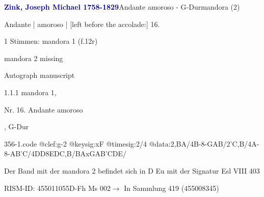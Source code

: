 \documentclass[twocolumn]{book}
\begin{document}
\par \vspace{7pt} \textcolor{darkblue}{\textbf{Zink, Joseph Michael  1758-1829}}\hfillplus{\textbf{[356]}}\newline Andante amoroso - G-Dur\newline mandora (2)
\par \begin{itshape}[f.12r, at left:] Andante | amoroso | [left before the accolade:] 16.\end{itshape} 
\par \textcolor{darkblue}{}  1 Stimmen: mandora 1  (f.12r)\newline \begin{small} mandora 2 missing\end{small} \newline Autograph manuscript
\par 1.1.1  mandora 1, \begin{itshape}Nr. 16. Andante amoroso\end{itshape}, G-Dur  
\begin{filecontents*}{356-1.code}
@clef:g-2
@keysig:xF
@timesig:2/4
@data:2,BA/4B-8-GAB/2'C,B/4A-8-A{B'C}/4DD8EDC,B/BAxGA{B'C}DE/
\end{filecontents*}
\newline
%
\par Der Band mit der mandora 2 befindet sich in D Eu mit der Signatur Esl VIII 403
\par RISM-ID: 455011055\newline D-Fh  Ms 002\newline $\rightarrow$ In Sammlung 419 (455008345)
      
\end{document}
